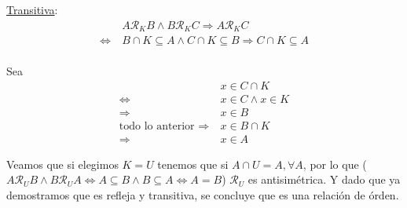 \documentclass[dcc]{fcfmcourse}
\begin{document}
\begin{problems}
\underline{Transitiva}: \\
\begin{align*}
& A \mathcal{R}_{K} B \land B \mathcal{R}_{K} C \Rightarrow A \mathcal{R}_{K} C\\
\Leftrightarrow\ & B \cap K \subseteq A \land C \cap K \subseteq B \Rightarrow C \cap K \subseteq A\\
\end{align*}

Sea 
\begin{align*}
& x \in C \cap K\\
\Leftrightarrow\ & x \in C \land x \in K\\
\Rightarrow\ & x \in B\\
\text{todo lo anterior }\Rightarrow\ & x \in B \cap K\\
\Rightarrow\ & x \in A
\end{align*}

Veamos que si elegimos $K = U$ tenemos que si $A \cap U = A, \forall A$, por lo que  ($A\mathcal{R}_{U}B \land B\mathcal{R}_{U}A \Leftrightarrow A\subseteq B \land B\subseteq A \Leftrightarrow A=B$) $\mathcal{R}_{U}$ es antisimétrica. Y dado que ya demostramos que es refleja y transitiva, se concluye que es una relación de órden.
\end{problems}
\end{document}
